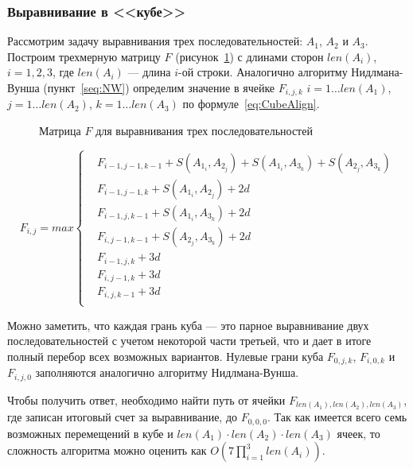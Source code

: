 \subsubsection[Выравнивание в <<кубе>>]{\large Выравнивание в <<кубе>>}
\hspace{\parindent} Рассмотрим задачу выравнивания трех последовательностей: $A_1$, $A_2$ и $A_3$. Построим трехмерную матрицу $F$ (рисунок~\ref{ris:Cube}) с длинами сторон $len(A_i)$, $i = 1,2,3$, где $len(A_i)$ --- длина $i$-ой строки. Аналогично алгоритму Нидлмана-Вунша (пункт~\ref{seq:NW}) определим значение в ячейке $F_{i,j,k}$ $i=1 \ldots len(A_1)$, $j=1 \ldots len(A_2)$, $k=1 \ldots len(A_3)$ по формуле~\ref{eq:CubeAlign}.

\begin{figure}[h]
	\caption{Матрица $F$ для выравнивания трех последовательностей}
	\label{ris:Cube}
\end{figure}

\begin{equation}\label{eq:CubeAlign}
F_{i,j} = max\left\{
	\begin{aligned}
		& F_{i-1,j-1,k-1} + S(A_{1_i},A_{2_j}) + S(A_{1_i},A_{3_k}) + S(A_{2_j},A_{3_k})\\
		& F_{i-1,j-1,k} + S(A_{1_i},A_{2_j}) + 2d\\
		& F_{i-1,j,k-1} + S(A_{1_i},A_{3_k}) + 2d\\
		& F_{i,j-1,k-1} + S(A_{2_j},A_{3_k}) + 2d\\
		& F_{i-1,j,k} + 3d\\
		& F_{i,j-1,k} + 3d\\
		& F_{i,j,k-1} + 3d\\
	\end{aligned}
	\right.
\end{equation}

\indent Можно заметить, что каждая грань куба --- это парное выравнивание двух последовательностей с учетом некоторой части третьей, что и дает в итоге полный перебор всех возможных вариантов. Нулевые грани куба $F_{0,j,k}$, $F_{i,0,k}$ и $F_{i,j,0}$ заполняются аналогично алгоритму Нидлмана-Вунша.

\indent  Чтобы получить ответ, необходимо найти путь от ячейки $F_{len(A_1),len(A_2),len(A_3)}$, где записан итоговый счет за выравнивание, до $F_{0,0,0}$. Так как имеется всего семь возможных перемещений в кубе и $len(A_1) \cdot len(A_2) \cdot len(A_3)$ ячеек, то сложность алгоритма можно оценить как $O(7\prod\limits_{i=1}^3len(A_i))$.

